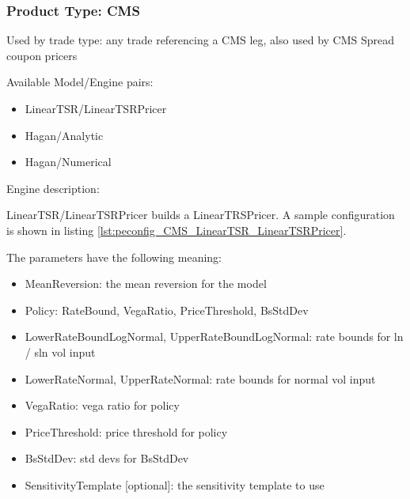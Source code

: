 \subsubsection{Product Type: CMS}

Used by trade type: any trade referencing a CMS leg, also used by CMS Spread coupon pricers

Available Model/Engine pairs:

\begin{itemize}
  \item LinearTSR/LinearTSRPricer
  \item Hagan/Analytic
  \item Hagan/Numerical
\end{itemize}

Engine description:

LinearTSR/LinearTSRPricer builds a LinearTRSPricer. A sample configuration is shown in listing
\ref{lst:peconfig_CMS_LinearTSR_LinearTSRPricer}.

The parameters have the following meaning:

\begin{itemize}
\item MeanReversion: the mean reversion for the model
\item Policy: RateBound, VegaRatio, PriceThreshold, BsStdDev
\item LowerRateBoundLogNormal, UpperRateBoundLogNormal: rate bounds for ln / sln vol input
\item LowerRateNormal, UpperRateNormal: rate bounds for normal vol input
\item VegaRatio: vega ratio for policy
\item PriceThreshold: price threshold for policy
\item BsStdDev: std devs for BsStdDev
\item SensitivityTemplate [optional]: the sensitivity template to use 
\end{itemize}

